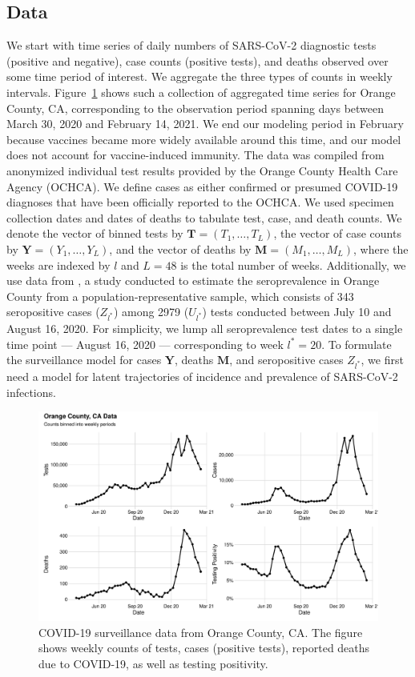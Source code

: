 \subsection{Data}
\label{ch_4:subsec:data}
We start with time series of daily numbers of SARS-CoV-2 diagnostic tests (positive and negative), case counts (positive tests), and deaths observed over some time period of interest.
We aggregate the three types of counts in weekly intervals.
Figure~\ref{ch_4:oc:data} shows such a collection of aggregated time series for Orange County, CA, corresponding to the observation period spanning days between March 30, 2020 and February 14, 2021.
We end our modeling period in February because vaccines became more widely available around this time, and our model does not account for vaccine-induced immunity.
The data was compiled from anonymized individual test results provided by the Orange County Health Care Agency (OCHCA).
We define cases as either confirmed or presumed COVID-19 diagnoses that have been officially reported to the OCHCA.
We used specimen collection dates and dates of deaths to tabulate test, case, and death counts.
We denote the vector of binned tests by $\mathbf{T} = (T_1, \dots, T_L)$, the vector of case counts by
$\mathbf{Y} = (Y_1, \dots, Y_L)$, and the vector of deaths by $\mathbf{M} = (M_1, \dots, M_L)$, where the weeks are indexed by $l$ and $L = 48$ is the total number of weeks.
Additionally, we use data from \cite{Bruckner2021}, a study conducted to estimate the seroprevalence in Orange County from a population-representative sample, which consists of 343 seropositive cases ($Z_{l^*}$) among 2979 ($U_{l^*}$) tests conducted between July 10 and August 16, 2020.
For simplicity, we lump all seroprevalence test dates to a single time point --- August 16, 2020 --- corresponding to week $l^*=20$.
To formulate the surveillance model for cases $\mathbf{Y}$, deaths $\mathbf{M}$, and seropositive cases $Z_{l^*}$, we first need a model for latent trajectories of incidence and prevalence of SARS-CoV-2 infections.

\begin{figure}[htbp]
\includegraphics[width=1.0\columnwidth]{binned_data_plot}
\caption{
COVID-19 surveillance data from Orange County, CA.
The figure shows weekly counts of tests, cases (positive tests), reported deaths due to COVID-19, as well as testing positivity.}
\label{ch_4:oc:data}
\end{figure}

